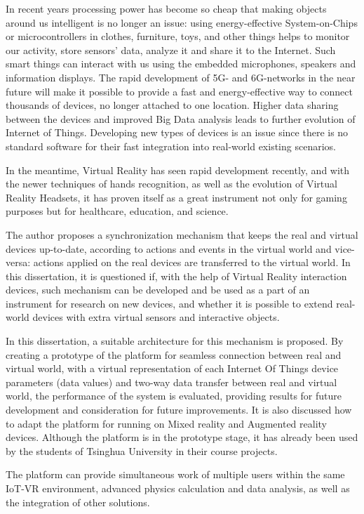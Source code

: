 \begin{abstract*}

  In recent years processing power has become so cheap that making objects around us intelligent is no longer an issue: using energy-effective System-on-Chips or microcontrollers in clothes, furniture, toys, and other things helps to monitor our activity, store sensors' data, analyze it and share it to the Internet. Such smart things can interact with us using the embedded microphones, speakers and information displays. The rapid development of 5G- and 6G-networks in the near future will make it possible to provide a fast and energy-effective way to connect thousands of devices, no longer attached to one location. Higher data sharing between the devices and improved Big Data analysis leads to further evolution of Internet of Things. Developing new types of devices is an issue since there is no standard software for  their fast integration into real-world existing scenarios.
   
  In the meantime, Virtual Reality has seen rapid development recently, and with the newer techniques of hands recognition, as well as the evolution of Virtual Reality Headsets, it has proven itself as a great instrument not only for gaming purposes but for healthcare, education, and science.
   
  The author proposes a synchronization mechanism that keeps the real and virtual devices up-to-date, according to actions and events in the virtual world and vice-versa: actions applied on the real devices are transferred to the virtual world. In this dissertation, it is questioned if, with the help of Virtual Reality interaction devices, such mechanism can be developed and be used as a part of an instrument for research on new devices, and whether it is possible to extend real-world devices with extra virtual sensors and interactive objects.
  
  In this dissertation, a suitable architecture for this mechanism is proposed. By creating a prototype of the platform for seamless connection between real and virtual world, with a virtual representation of each Internet Of Things device parameters (data values) and two-way data transfer between real and virtual world, the performance of the system is evaluated, providing results for future development and consideration for future improvements. It is also discussed how to adapt the platform for running on Mixed reality and Augmented reality devices. Although the platform is in the prototype stage, it has already been used by the students of Tsinghua University in their course projects. 
  
  The platform can provide simultaneous work of multiple users within the same IoT-VR environment, advanced physics calculation and data analysis, as well as the integration of other solutions.
 


\end{abstract*}
